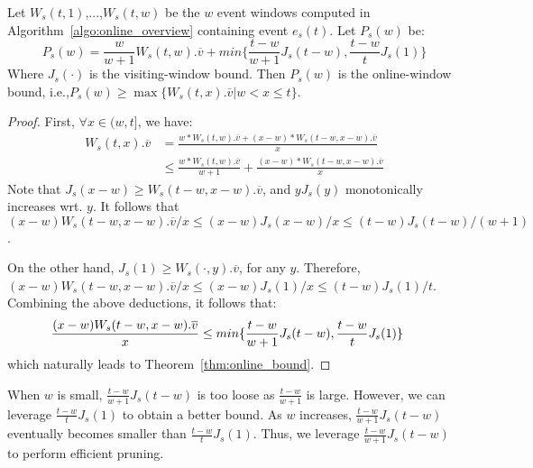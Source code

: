 \begin{theorem}
\label{thm:online_bound}
Let $W_s(t,1)$,...,$W_s(t,w)$ be the $w$ event windows computed in Algorithm~\ref{algo:online_overview} containing event $e_s(t)$. Let $P_s(w)$ be:
\begin{equation}
	P_s(w) = \frac{w}{w+1}W_s(t,w).\overline{v}+ min\{\frac{t-w}{w+1}J_s(t-w), \frac{t-w}{t}J_s(1) \}
\end{equation}
Where $J_s(\cdot)$ is the visiting-window bound.  Then $P_s(w)$ is the online-window bound, i.e.,$P_s(w) \geq \max\{W_s(t,x).\overline{v}| w < x \leq t \}$.
\end{theorem}
\begin{proof}
First, $\forall x \in (w,t]$, we have: 
\begin{align*}
W_s(t,x).\overline{v} &= \frac{w*W_s(t,w).\overline{v} + (x-w)*W_s(t-w,x-w).\overline{v}}{x} \\
& \leq \frac{w*W_s(t,w).\overline{v}}{w+1} + \frac{(x-w)*W_s(t-w,x-w).\overline{v}}{x}
\end{align*}
Note that $J_s(x-w) \geq W_s(t-w, x-w).\overline{v}$, and $yJ_s(y)$ monotonically increases wrt. $y$.
It follows that $(x-w)W_s(t-w,x-w).\overline{v}/{x} \leq (x-w)J_s(x-w)/{x} \leq (t-w)J_s(t-w)/(w+1)$.

On the other hand, $J_s(1)\geq W_s(\cdot,y).\overline{v}$, for any $y$. Therefore,
$(x-w)W_s(t-w,x-w).\overline{v}/{x} \leq (x-w)J_s(1)/x \leq (t-w)J_s(1)/t$.
Combining the above deductions, it follows that:
\begin{equation*}
\hspace{-4mm}\frac{(x-w)W_s(t-w,x-w).\overline{v}}{x} \leq min\{\frac{t-w}{w+1}J_s(t-w), \frac{t-w}{t}J_s(1) \}
\end{equation*}
which naturally leads to Theorem~\ref{thm:online_bound}. 
\end{proof}

When $w$ is small, $\frac{t-w}{w+1}J_s(t-w)$ is too loose as $\frac{t-w}{w+1}$ is large. However, we can leverage $\frac{t-w}{t}J_s(1)$ to obtain a better bound. As $w$ increases, $\frac{t-w}{w+1}J_s(t-w)$ eventually becomes smaller than $\frac{t-w}{t}J_s(1)$. Thus, we leverage $\frac{t-w}{w+1}J_s(t-w)$ to perform efficient pruning. 


